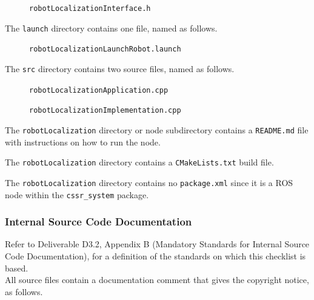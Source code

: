 \documentclass{CSSRforAfrica}
\newcommand{\checkboxChecked}{\fbox{\ding{51}}} %
\begin{document}
\begin{description}
\begin{description}
\item[\checkboxChecked] {\small \verb+robotLocalizationInterface.h+}  
\end{description} 

\item[\checkboxChecked] The  {\small \verb+launch+} directory contains one file, named as follows.
\begin{description}
\item[\checkboxChecked] {\small \verb+robotLocalizationLaunchRobot.launch+}
\end{description} 


\item[\checkboxChecked] The  {\small \verb+src+} directory contains two source files, named as follows.
\begin{description}
\item[\checkboxChecked] {\small \verb+robotLocalizationApplication.cpp+}  
\item[\checkboxChecked]  {\small \verb+robotLocalizationImplementation.cpp+}  
\end{description} 

\item[\checkboxChecked] The {\small \verb+robotLocalization+} directory or node subdirectory contains  a {\small \verb+README.md+} file with  instructions on how to run the node.

\item[\checkboxChecked] The {\small \verb+robotLocalization+} directory contains  a {\small \verb+CMakeLists.txt+} build file.

\item[\checkboxChecked] The {\small \verb+robotLocalization+} directory contains no {\small \verb+package.xml+} since it is a ROS node within the {\small \verb+cssr_system+} package.

\end{description}

\subsubsection{Internal Source Code Documentation}

Refer to Deliverable D3.2, Appendix B (Mandatory Standards for Internal Source Code Documentation), for a definition of the standards on which this checklist is based.\\

\noindent All source files contain a documentation comment that gives the copyright notice, as follows.
 
\end{document}
